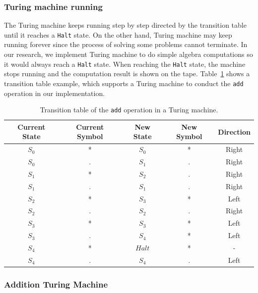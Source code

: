 \documentclass[lnicst]{svmultln}
\begin{document}
\subsubsection{Turing machine running}
The Turing machine keeps running step by step directed by the transition table
until it reaches a \texttt{Halt} state. On the other hand, Turing machine may
keep running forever since the process of solving some problems cannot
terminate. In our research, we implement Turing machine to do simple algebra
computations so it would always reach a \texttt{Halt} state. When reaching the
\texttt{Halt} state, the machine stops running and the computation result is
shown on the tape. Table~\ref{table:1} shows a transition table example, which
supports a Turing machine to conduct the \texttt{add} operation in our
implementation.

\begin{table}
\centering
\begin{tabular}{ |c|c|c|c|c|} 
  \hline
  \textbf{Current State} & \textbf{Current Symbol} & \textbf{New State} & \textbf{New Symbol} & \textbf{Direction} \\ 
  \hline
  \(S_0\) & * & \(S_0\) & * & Right\\ 
  \hline
  \(S_0\) & . &\(S_1\)  & . & Right\\
  \hline
  \(S_1\) & * &\(S_2\) & . & Right\\  
  \hline
  \(S_1\) & . & \(S_1\) & . & Right \\
  \hline
  \(S_2\) & * & \(S_3\) & * & Left \\
  \hline
  \(S_2\) & . & \(S_2\) & . & Right \\
  \hline
  \(S_3\) & * & \(S_3\) & * & Left \\
  \hline
  \(S_3\) & . & \(S_4\) & * & Left \\
  \hline
  \(S_4\) & * & \(Halt\) & * & - \\
  \hline
  \(S_4\) & . & \(S_4\) & . & Left\\
  \hline

\end{tabular}
\caption{Transition table of the \texttt{add} operation in a Turing machine.}
\label{table:1}
\end{table}

\subsubsection{Addition Turing Machine}
\end{document}
